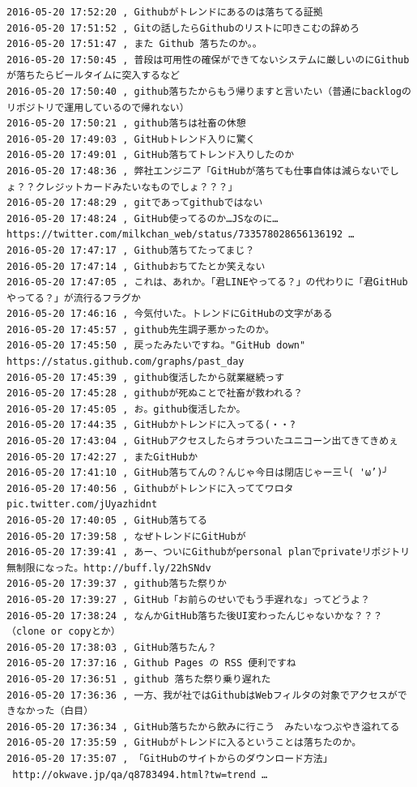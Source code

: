 \begin{verbatim}
2016-05-20 17:52:20 , Githubがトレンドにあるのは落ちてる証拠
2016-05-20 17:51:52 , Gitの話したらGithubのリストに叩きこむの辞めろ
2016-05-20 17:51:47 , また Github 落ちたのか。。
2016-05-20 17:50:45 , 普段は可用性の確保ができてないシステムに厳しいのにGithubが落ちたらビールタイムに突入するなど
2016-05-20 17:50:40 , github落ちたからもう帰りますと言いたい（普通にbacklogのリポジトリで運用しているので帰れない）
2016-05-20 17:50:21 , github落ちは社畜の休憩
2016-05-20 17:49:03 , GitHubトレンド入りに驚く
2016-05-20 17:49:01 , GitHub落ちてトレンド入りしたのか
2016-05-20 17:48:36 , 弊社エンジニア「GitHubが落ちても仕事自体は減らないでしょ？？クレジットカードみたいなものでしょ？？？」
2016-05-20 17:48:29 , gitであってgithubではない
2016-05-20 17:48:24 , GitHub使ってるのか…JSなのに… 
https://twitter.com/milkchan_web/status/733578028656136192 …
2016-05-20 17:47:17 , Github落ちてたってまじ？
2016-05-20 17:47:14 , Githubおちてたとか笑えない
2016-05-20 17:47:05 , これは、あれか。「君LINEやってる？」の代わりに「君GitHubやってる？」が流行るフラグか
2016-05-20 17:46:16 , 今気付いた。トレンドにGitHubの文字がある
2016-05-20 17:45:57 , github先生調子悪かったのか。
2016-05-20 17:45:50 , 戻ったみたいですね。"GitHub down" 
https://status.github.com/graphs/past_day 
2016-05-20 17:45:39 , github復活したから就業継続っす
2016-05-20 17:45:28 , githubが死ぬことで社畜が救われる？
2016-05-20 17:45:05 , お。github復活したか。
2016-05-20 17:44:35 , GitHubかトレンドに入ってる(・・?
2016-05-20 17:43:04 , GitHubアクセスしたらオラついたユニコーン出てきてきめぇ
2016-05-20 17:42:27 , またGitHubか
2016-05-20 17:41:10 , GitHub落ちてんの？んじゃ今日は閉店じゃー三╰( 'ω’)╯
2016-05-20 17:40:56 , Githubがトレンドに入っててワロタ pic.twitter.com/jUyazhidnt
2016-05-20 17:40:05 , GitHub落ちてる
2016-05-20 17:39:58 , なぜトレンドにGitHubが
2016-05-20 17:39:41 , あー、ついにGithubがpersonal planでprivateリポジトリ無制限になった。http://buff.ly/22hSNdv 
2016-05-20 17:39:37 , github落ちた祭りか
2016-05-20 17:39:27 , GitHub「お前らのせいでもう手遅れな」ってどうよ？
2016-05-20 17:38:24 , なんかGitHub落ちた後UI変わったんじゃないかな？？？（clone or copyとか）
2016-05-20 17:38:03 , GitHub落ちたん？
2016-05-20 17:37:16 , Github Pages の RSS 便利ですね
2016-05-20 17:36:51 , github 落ちた祭り乗り遅れた
2016-05-20 17:36:36 , 一方、我が社ではGithubはWebフィルタの対象でアクセスができなかった（白目）
2016-05-20 17:36:34 , GitHub落ちたから飲みに行こう　みたいなつぶやき溢れてる
2016-05-20 17:35:59 , GitHubがトレンドに入るということは落ちたのか。
2016-05-20 17:35:07 , 「GitHubのサイトからのダウンロード方法」
 http://okwave.jp/qa/q8783494.html?tw=trend … 

\end{verbatim}
